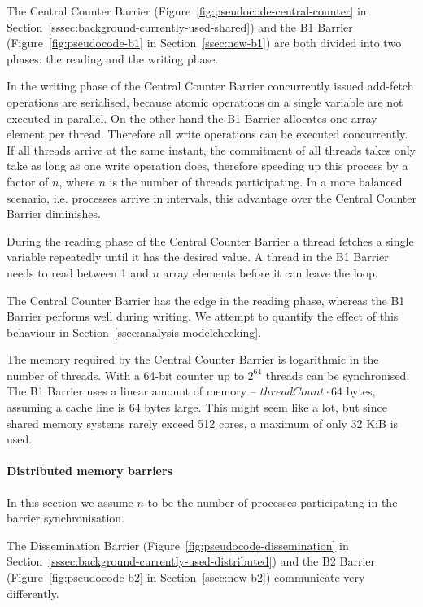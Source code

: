 \documentclass[a4paper, 10pt]{article}
\begin{document}
The Central Counter Barrier (Figure~\ref{fig:pseudocode-central-counter} in Section~\ref{sssec:background-currently-used-shared}) and the B1 Barrier (Figure~\ref{fig:pseudocode-b1} in Section~\ref{ssec:new-b1}) are both divided into two phases: the reading and the writing phase.

In the writing phase of the Central Counter Barrier concurrently issued add-fetch operations are serialised, because atomic operations on a single variable are not executed in parallel. On the other hand the B1 Barrier allocates one array element per thread. Therefore all write operations can be executed concurrently. If all threads arrive at the same instant, the commitment of all threads takes only take as long as one write operation does, therefore speeding up this process by a factor of $n$, where $n$ is the number of threads participating. In a more balanced scenario, i.e. processes arrive in intervals, this advantage over the Central Counter Barrier diminishes.

During the reading phase of the Central Counter Barrier a thread fetches a single variable repeatedly until it has the desired value. A thread in the B1 Barrier needs to read between 1 and $n$ array elements before it can leave the loop.

The Central Counter Barrier has the edge in the reading phase, whereas the B1 Barrier performs well during writing. We attempt to quantify the effect of this behaviour in Section~\ref{ssec:analysis-modelchecking}.

The memory required by the Central Counter Barrier is logarithmic in the number of threads. With a 64-bit counter up to $2^{64}$ threads can be synchronised. The B1 Barrier uses a linear amount of memory -- $\mathit{threadCount} \cdot 64$ bytes, assuming a cache line is 64 bytes large. This might seem like a lot, but since shared memory systems rarely exceed 512 cores, a maximum of only 32 KiB is used.

\paragraph{Distributed memory barriers}
\label{sssec:analysis-general-distributed}
In this section we assume $n$ to be the number of processes participating in the barrier synchronisation.

The Dissemination Barrier (Figure~\ref{fig:pseudocode-dissemination} in Section~\ref{sssec:background-currently-used-distributed}) and the B2 Barrier (Figure~\ref{fig:pseudocode-b2} in Section~\ref{ssec:new-b2}) communicate very differently.
\end{document}
